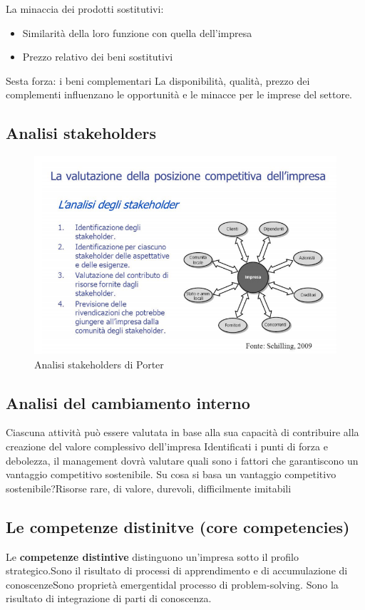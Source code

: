 \documentclass{article}
\begin{document}
La minaccia dei prodotti sostitutivi:
\begin{itemize}
	\item Similarità della loro funzione con quella
	dell’impresa
	\item Prezzo relativo dei beni sostitutivi
\end{itemize}

Sesta forza: i beni complementari
La disponibilità, qualità, prezzo dei complementi
influenzano le opportunità e le minacce per le
imprese del settore.

\subsection{Analisi stakeholders}

\begin{figure}[h!]
	\centering
	\includegraphics[scale=0.4]{images/stakeholders.png}
	\caption{Analisi stakeholders di Porter}
	\label{fig:Porter2}
\end{figure}

\subsection{Analisi del cambiamento interno }
Ciascuna attività può essere valutata in base alla sua capacità di contribuire alla creazione del valore complessivo dell’impresa Identificati i punti di forza e debolezza, il management dovrà valutare quali sono i fattori che garantiscono un vantaggio competitivo sostenibile.
Su cosa si basa un vantaggio competitivo sostenibile?Risorse rare, di valore, durevoli, difficilmente imitabili

\subsection{Le competenze distinitve (core competencies)}
Le \textbf{competenze distintive} distinguono un’impresa sotto il profilo strategico.Sono il risultato di processi di apprendimento e di accumulazione di conoscenzeSono proprietà emergentidal processo di problem-solving. Sono la risultato di integrazione di parti di conoscenza.
\end{document}

